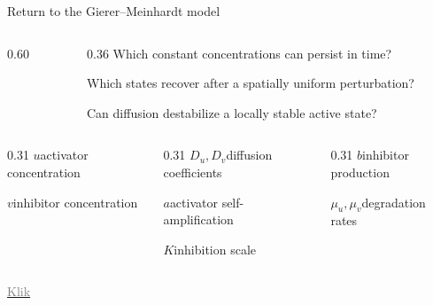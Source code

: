\begin{frame}{Return to the Gierer--Meinhardt model}
\begin{columns}[c,onlytextwidth]
\begin{column}{0.60\textwidth}
    \end{column}

    \begin{column}{0.36\textwidth}
      \vspace{0.8cm}
        {Which constant concentrations can persist in time?}

      \vspace{-0.09cm}

        {Which states recover after a spatially uniform perturbation?}

      \vspace{-0.09cm}

        {Can diffusion destabilize a locally stable active state?}

    \end{column}

  \end{columns}

  \vspace{0.42cm}

  {\color{HydraWhite}\fontsize{7.2}{8.9}\selectfont
  \begin{columns}[T,onlytextwidth]

    \begin{column}{0.31\textwidth}
      \textcolor{HydraGold}{$u$}\quad activator concentration

      \vspace{0.10cm}

      \textcolor{HydraCyan}{$v$}\quad inhibitor concentration
    \end{column}

    \begin{column}{0.31\textwidth}
      \textcolor{HydraCyan}{$D_u,D_v$}\quad diffusion coefficients

      \vspace{0.10cm}

      \textcolor{HydraGold}{$a$}\quad activator self-amplification

      \vspace{0.10cm}

      \textcolor{HydraGold}{$K$}\quad inhibition scale
    \end{column}

    \begin{column}{0.31\textwidth}
      \textcolor{HydraGold}{$b$}\quad inhibitor production

      \vspace{0.10cm}

      \textcolor{HydraWhite}{$\mu_u,\mu_v$}\quad degradation rates
    \end{column}

  \end{columns}
  }
  \vspace{0.2cm}
  \hyperlink{example}{\textcolor{gray}{Klik}}

\end{frame}


